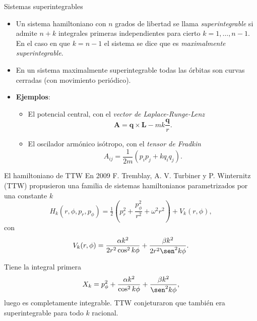 \documentclass[aspectratio=169,mathserif]{beamer}
\newcommand{\vect}[1]{\mathbf{#1}}
\begin{document}
  \begin{frame}{Sistemas superintegrables}
    \begin{itemize}
      \item Un sistema hamiltoniano con $n$ grados de libertad se llama \emph{superintegrable} si admite $n+k$ integrales primeras independientes para cierto $k=1,\dots,n-1$. En el caso en que $k=n-1$ el sistema se dice que es \emph{maximalmente superintegrable}.
    \pause
      \item En un sistema maximalmente superintegrable todas las órbitas son curvas cerradas (con movimiento periódico).
    \pause
      \item \textbf{Ejemplos}:
    \pause
	\begin{itemize}
	  \item El potencial central, con el \emph{vector de Laplace-Runge-Lenz} 
	    \begin{equation*}
	      \vect{A}=\vect{q}\times \vect{L} - mk\frac{\vect{q}}{r}.
	    \end{equation*}
    \pause
	  \item El oscilador armónico isótropo, con el \emph{tensor de Fradkin}
	    \begin{equation*}
	      A_{ij}=\frac{1}{2m}(p_ip_j+kq_iq_j).
	    \end{equation*}
	\end{itemize}
    \end{itemize}
    
  \end{frame}

  \begin{frame}{El hamiltoniano de TTW}
    En 2009 F. Tremblay, A. V. Turbiner y P. Winternitz (TTW) propusieron una familia de sistemas hamiltonianos parametrizados por una constante $k$
    \begin{equation*}
      H_k(r,\phi, p_r, p_\phi)=\tfrac{1}{2}\left( p_r^2+\frac{p_\phi^2}{r^2}+\omega^2 r^2 \right) + V_k(r,\phi),
    \end{equation*}
    con
    \begin{equation*}
      V_k(r,\phi)=\frac{\alpha k^2}{2r^2 \cos^2 k\phi}+ \frac{\beta k^2}{2r^2\sen^2 k\phi}.
    \end{equation*}
    \pause

    Tiene la integral primera
    \begin{equation*}
      X_k=p_\phi^2 + \frac{\alpha k^2}{\cos^2 k\phi}+ \frac{\beta k^2}{\sen^2 k\phi},
    \end{equation*}
    luego es completamente integrable. TTW conjeturaron que también era superintegrable para todo $k$ racional.
  \end{frame}
\end{document}
